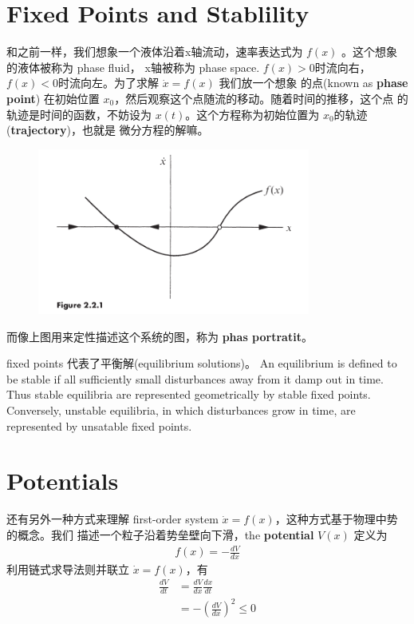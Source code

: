 \section{Fixed Points and Stablility}
和之前一样，我们想象一个液体沿着x轴流动，速率表达式为 $ f(x) $ 。这个想象的液体被称为 phase fluid， x轴被称为
phase space. $ f(x) > 0$时流向右， $f(x) < 0$时流向左。为了求解 $ \dot{x} = f(x) $ 我们放一个想象
的点(known as \textbf{phase point}) 在初始位置 $x_0$，然后观察这个点随流的移动。随着时间的推移，这个点
的轨迹是时间的函数，不妨设为 $x(t)$。这个方程称为初始位置为 $x_0$的轨迹(\textbf{trajectory})，也就是
微分方程的解嘛。
\begin{figure}[htbp]
    \centering
    \includegraphics[width=0.8\textwidth]{figures/1-2.png}
    \caption{}
\end{figure}
而像上图用来定性描述这个系统的图，称为 \textbf{phas portratit}。
\par fixed points 代表了平衡解(equilibrium solutions)。 An equilibrium is defined to be stable if 
all sufficiently small disturbances away from it damp out in time. Thus stable equilibria 
are represented geometrically by stable fixed points. Conversely, unstable equilibria,
in which disturbances grow in time, are represented by unsatable fixed points.

\section{Potentials}
还有另外一种方式来理解 first-order system $ \dot{x} = f(x) $，这种方式基于物理中势的概念。我们
描述一个粒子沿着势垒壁向下滑，the \textbf{potential} $ V(x) $ 定义为
\begin{equation}
    \begin{aligned} 
    f(x) = - \frac{dV}{dx}
    \end{aligned} 
\end{equation}
利用链式求导法则并联立 $\dot{x} = f(x)$，有
\begin{equation}
    \begin{aligned} 
    \frac{dV}{dt} &= \frac{dV}{dx}\frac{dx}{dt} \\
                    &= -\left( \frac{dV}{dx}\right)^2 \le 0
    \end{aligned} 
\end{equation}
